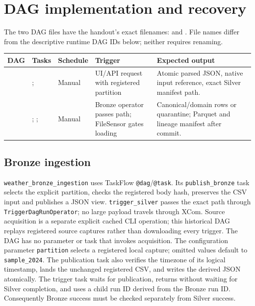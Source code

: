 \documentclass[10pt]{article}
\begin{document}
\section{DAG implementation and recovery}
The two DAG files have the handout's exact filenames:
 and
. File names differ from the descriptive
runtime DAG IDs below; neither requires renaming.

\begin{longtable}{@{}L{3.0cm}L{3.3cm}L{1.5cm}L{3.5cm}L{3.8cm}@{}}
\toprule DAG & Tasks & Schedule & Trigger & Expected output\\\midrule\endhead
{} & ;  & Manual & UI/API request with registered partition & Atomic parsed JSON, native input reference, exact Silver manifest path.\\
 & ; ;  & Manual & Bronze operator passes path; FileSensor gates loading & Canonical/domain rows or quarantine; Parquet and lineage manifest after commit.\\
\bottomrule\end{longtable}

\subsection{Bronze ingestion}
\texttt{weather\_bronze\_ingestion} uses TaskFlow \texttt{@dag}/\texttt{@task}.
Its \texttt{publish\_bronze} task selects the explicit partition, checks the
registered body hash, preserves the CSV input and publishes a JSON view.
\texttt{trigger\_silver} passes the exact path through
\texttt{TriggerDagRunOperator}; no large payload travels through XCom.
Source acquisition is a separate explicit cached CLI operation; this historical
DAG replays registered source captures rather than downloading every trigger.
The DAG has no parameter or task that invokes acquisition. The configuration
parameter \texttt{partition} selects a registered local capture; omitted values
default to \texttt{sample\_2024}. The publication task also verifies the timezone
of its logical timestamp, lands the unchanged registered CSV, and writes the
derived JSON atomically. The trigger task waits for publication, returns without
waiting for Silver completion, and uses a child run ID derived from the Bronze
run ID. Consequently Bronze success must be checked separately from Silver success.
\end{document}
